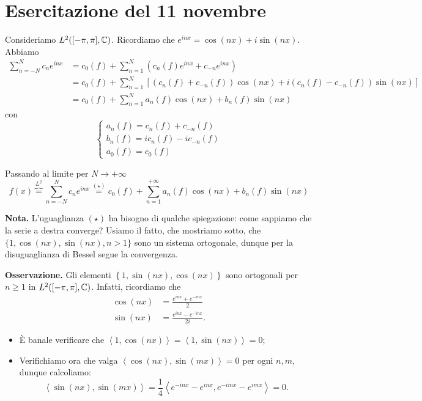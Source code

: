 %
%

\section{Esercitazione del 11 novembre}

Consideriamo $L^2([-\pi,\pi], \mathbb C) $. Ricordiamo che $e^{inx} = \cos(nx) + i \sin(nx)$. 
Abbiamo
%
\begin{align*}
\sum_{n=-N}^N c_n e^{inx} & = c_0(f) + \sum_{n=1}^N \left( c_n(f) e^{inx} + c_{-n} e^{inx} \right) \\
& = c_0(f) + \sum_{n=1}^{N} \left[ \left( c_n(f) + c_{-n}(f) \right) \cos(nx) + i\left( c_n(f) - c_{-n}(f) \right) \sin(nx) \right] \\
& = c_0(f) + \sum_{n=1}^{N} a_n(f) \cos(nx) + b_n(f) \sin(nx)  
\end{align*}
con
%
$$
\begin{cases}
a_n(f) = c_n(f) + c_{-n}(f) \\
b_n(f) = i c_n(f) - i c_{-n} (f) \\
a_0(f) = c_0(f)
\end{cases} 
$$
%

Passando al limite per $N \to +\infty$
%
$$
f(x) \overbrace{=}^{L^2} \sum_{n=-N}^N c_n e^{inx} 
\overset{(\star)}{=} c_0(f) + \sum_{n=1}^{+\infty} a_n(f) \cos(nx) + b_n(f) \sin(nx) 
$$
%

\textbf{Nota.} L'uguaglianza $(\star)$ ha bisogno di qualche spiegazione: come sappiamo che la serie a destra converge? Usiamo il fatto, che mostriamo sotto, che $\{1, \cos(nx), \sin(nx), n > 1 \}$ sono un sistema ortogonale, dunque per la disuguaglianza di Bessel segue la convergenza.

\textbf{Osservazione.} Gli elementi $\left\{ 1, \sin(nx), \cos(nx) \right\}$ sono ortogonali per $n \geq 1$ in $L^2([-\pi,\pi], \mathbb C) $.
Infatti, ricordiamo che
\begin{align*}
\cos(nx) & = \frac{e^{inx} + e^{-inx}}{2}\\
\sin(nx) & = \frac{e^{inx} - e^{-inx}}{2i}. 
\end{align*}

\begin{itemize}

	\item È banale verificare che $\left<1,\cos(nx) \right> = \left<1, \sin(nx) \right> = 0$; 

	\item Verifichiamo ora che valga $\left<\cos(nx), \sin(mx) \right> = 0$ per ogni $n,m$, dunque calcoliamo:
	$$
		\left<\sin(nx), \sin(mx) \right> = \frac{1}{4} \left<e^{-inx} - e^{inx}, e^{-imx} - e^{imx} \right> = 0.
	$$

\end{itemize}

